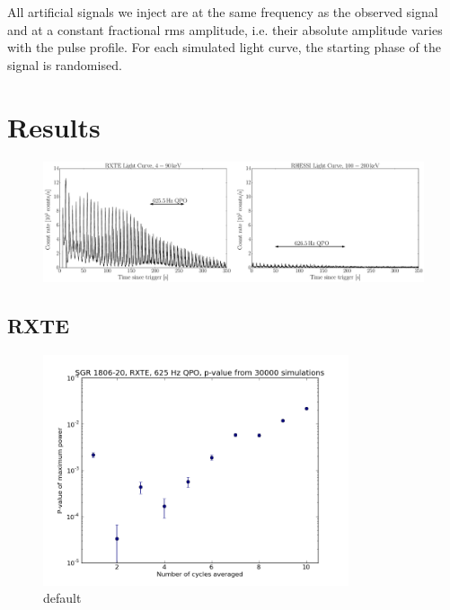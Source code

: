 \documentclass{emulateapj}
\begin{document}
All artificial signals we inject are at the same frequency as the observed signal and at a constant fractional rms amplitude, i.e. their absolute amplitude varies with the pulse profile. For each simulated light curve, the starting phase of the signal is randomised. 

\section{Results}
\label{sec:results}

\begin{figure}[htbp]
\begin{center}
\includegraphics[width=18cm]{lightcurves.eps}
\caption{}
\label{fig:lcs}
\end{center}
\end{figure}

\subsection{RXTE}
\label{sec:rxte_results}

\begin{figure}[htbp]
\begin{center}
\includegraphics[width=9cm]{1806_rxte_pvals.png}
\caption{default}
\label{fig:rxte_pvals}
\end{center}
\end{figure}
\end{document}
